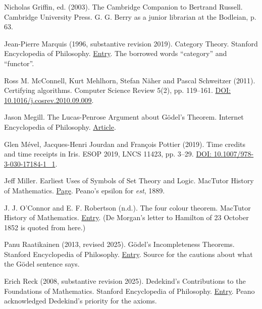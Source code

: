 \documentclass[11pt,twoside]{article}
\theoremstyle{thielethm}
\theoremstyle{thieledef}
\theoremstyle{thieledef}
\theoremstyle{thieledef}
\theoremstyle{thielethm}
\theoremstyle{thieleobs}
\theoremstyle{thielethm}
\begin{document}
\noindent Nicholas Griffin, ed. (2003). The Cambridge Companion to Bertrand Russell. Cambridge University Press. G. G. Berry as a junior librarian at the Bodleian, p. 63.
\par\medskip

\noindent Jean-Pierre Marquis (1996, substantive revision 2019). Category Theory. Stanford Encyclopedia of Philosophy. \href{https://plato.stanford.edu/entries/category-theory/}{Entry}. The borrowed words ``category'' and ``functor''.
\par\medskip

\noindent Ross M. McConnell, Kurt Mehlhorn, Stefan Näher and Pascal Schweitzer (2011). Certifying algorithms. Computer Science Review 5(2), pp. 119--161. \href{https://doi.org/10.1016/j.cosrev.2010.09.009}{DOI: 10.1016/j.cosrev.2010.09.009}.
\par\medskip

\noindent Jason Megill. The Lucas-Penrose Argument about Gödel's Theorem. Internet Encyclopedia of Philosophy. \href{https://iep.utm.edu/lp-argue/}{Article}.
\par\medskip

\noindent Glen Mével, Jacques-Henri Jourdan and François Pottier (2019). Time credits and time receipts in Iris. ESOP 2019, LNCS 11423, pp. 3--29. \href{https://doi.org/10.1007/978-3-030-17184-1_1}{DOI: 10.1007/978-3-030-17184-1\_1}.
\par\medskip

\noindent Jeff Miller. Earliest Uses of Symbols of Set Theory and Logic. MacTutor History of Mathematics. \href{https://mathshistory.st-andrews.ac.uk/Miller/mathsym/set/}{Page}. Peano's epsilon for \emph{est}, 1889.
\par\medskip

\noindent J. J. O'Connor and E. F. Robertson (n.d.). The four colour theorem. MacTutor History of Mathematics. \href{https://mathshistory.st-andrews.ac.uk/HistTopics/The_four_colour_theorem/}{Entry}. (De Morgan's letter to Hamilton of 23 October 1852 is quoted from here.)
\par\medskip

\noindent Panu Raatikainen (2013, revised 2025). Gödel's Incompleteness Theorems. Stanford Encyclopedia of Philosophy. \href{https://plato.stanford.edu/entries/goedel-incompleteness/}{Entry}. Source for the cautions about what the Gödel sentence says.
\par\medskip

\noindent Erich Reck (2008, substantive revision 2025). Dedekind's Contributions to the Foundations of Mathematics. Stanford Encyclopedia of Philosophy. \href{https://plato.stanford.edu/entries/dedekind-foundations/}{Entry}. Peano acknowledged Dedekind's priority for the axioms.
\par\medskip
\end{document}
